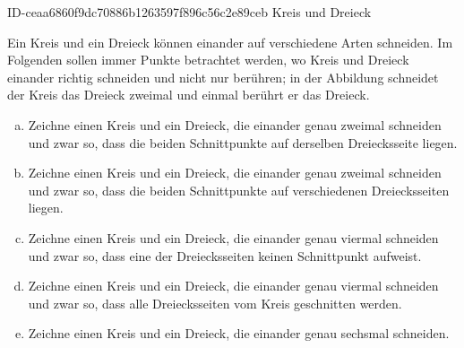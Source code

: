 \begin{exercise}
      {ID-ceaa6860f9dc70886b1263597f896c56c2e89ceb}
      {Kreis und Dreieck}
  \ifproblem\problem
    \begin{minipage}{0.75\textwidth}
      Ein Kreis und ein Dreieck können einander auf verschiedene Arten
      schneiden. Im Folgenden sollen immer Punkte betrachtet werden, wo Kreis
      und Dreieck einander richtig schneiden und nicht nur berühren; in der
      Abbildung schneidet der Kreis das Dreieck zweimal und einmal berührt
      er das Dreieck.
    \end{minipage}\hfill
    \begin{minipage}{0.24\textwidth}
      \centering
    \end{minipage}\par
    \begin{enumerate}[a)]
      \item Zeichne einen Kreis und ein Dreieck, die einander genau zweimal
            schneiden und zwar so, dass die beiden Schnittpunkte auf derselben
            Dreiecksseite liegen.
      \item Zeichne einen Kreis und ein Dreieck, die einander genau zweimal
            schneiden und zwar so, dass die beiden Schnittpunkte auf verschiedenen
            Dreiecksseiten liegen.
      \item Zeichne einen Kreis und ein Dreieck, die einander genau viermal
            schneiden und zwar so, dass eine der Dreiecksseiten keinen Schnittpunkt
            aufweist.
      \item Zeichne einen Kreis und ein Dreieck, die einander genau viermal
            schneiden und zwar so, dass alle Dreiecksseiten vom Kreis geschnitten
            werden.
      \item Zeichne einen Kreis und ein Dreieck, die einander genau sechsmal
            schneiden.
    \end{enumerate}
  \fi
\end{exercise}
